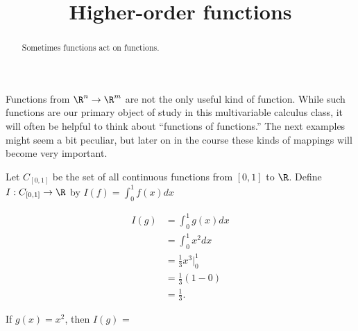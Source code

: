 \documentclass{ximera}
\title{Higher-order functions}
\begin{document}
\begin{abstract}
  Sometimes functions act on functions.
\end{abstract}

Functions from $\R^n \to \R^m$ are not the only useful kind of
function.  While such functions are our primary object of study in
this multivariable calculus class, it will often be helpful to think
about ``functions of functions.''  The next examples might seem a bit
peculiar, but later on in the course these kinds of mappings will
become very important.

\begin{question}
  Let $C_{[0,1]}$ be the set of all continuous functions from $[0,1]$ to $\R$.  Define $I:C_{[0,1]} \to \R$ by $I(f) = \displaystyle \int_0^1 f(x)dx$ 
  \begin{solution}
    \begin{hint}
      \begin{align*}
        I(g) &= \int_0^1 g(x)dx\\
        &= \int_0^1 x^2dx\\
        &= \frac{1}{3} x^3\big|_0^1\\
        &= \frac{1}{3}(1-0)\\
        &= \frac{1}{3}.
      \end{align*}
    \end{hint}
    
    If $g(x)  = x^2$, then $I(g)$ = 
  \end{solution}
\end{question}
\end{document}
